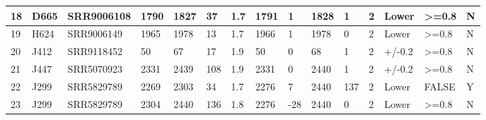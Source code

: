 \documentclass[a4paper]{paper}
\begin{document}
\begin{table}[htp]
\begin{tabular}{p{3cm}llllllllllllll}
\multicolumn{1}{|l|}{18} & \multicolumn{1}{l|}{D665} & \multicolumn{1}{l|}{SRR9006108} & \multicolumn{1}{l|}{1790} & \multicolumn{1}{l|}{1827} & \multicolumn{1}{l|}{37} & \multicolumn{1}{l|}{1.7} & \multicolumn{1}{l|}{1791} & \multicolumn{1}{l|}{1} & \multicolumn{1}{l|}{1828} & \multicolumn{1}{l|}{1} & \multicolumn{1}{l|}{2} & \multicolumn{1}{l|}{Lower} & \multicolumn{1}{l|}{\textgreater{}=0.8} & \multicolumn{1}{l|}{N} \\ \hline
\multicolumn{1}{|l|}{19} & \multicolumn{1}{l|}{H624} & \multicolumn{1}{l|}{SRR9006149} & \multicolumn{1}{l|}{1965} & \multicolumn{1}{l|}{1978} & \multicolumn{1}{l|}{13} & \multicolumn{1}{l|}{1.7} & \multicolumn{1}{l|}{1966} & \multicolumn{1}{l|}{1} & \multicolumn{1}{l|}{1978} & \multicolumn{1}{l|}{0} & \multicolumn{1}{l|}{2} & \multicolumn{1}{l|}{Lower} & \multicolumn{1}{l|}{\textgreater{}=0.8} & \multicolumn{1}{l|}{N} \\ \hline
\multicolumn{1}{|l|}{20} & \multicolumn{1}{l|}{J412} & \multicolumn{1}{l|}{SRR9118452} & \multicolumn{1}{l|}{50} & \multicolumn{1}{l|}{67} & \multicolumn{1}{l|}{17} & \multicolumn{1}{l|}{1.9} & \multicolumn{1}{l|}{50} & \multicolumn{1}{l|}{0} & \multicolumn{1}{l|}{68} & \multicolumn{1}{l|}{1} & \multicolumn{1}{l|}{2} & \multicolumn{1}{l|}{+/-0.2} & \multicolumn{1}{l|}{\textgreater{}=0.8} & \multicolumn{1}{l|}{N} \\ \hline
\multicolumn{1}{|l|}{21} & \multicolumn{1}{l|}{J447} & \multicolumn{1}{l|}{SRR5070923} & \multicolumn{1}{l|}{2331} & \multicolumn{1}{l|}{2439} & \multicolumn{1}{l|}{108} & \multicolumn{1}{l|}{1.9} & \multicolumn{1}{l|}{2331} & \multicolumn{1}{l|}{0} & \multicolumn{1}{l|}{2440} & \multicolumn{1}{l|}{1} & \multicolumn{1}{l|}{2} & \multicolumn{1}{l|}{+/-0.2} & \multicolumn{1}{l|}{\textgreater{}=0.8} & \multicolumn{1}{l|}{N} \\ \hline
\multicolumn{1}{|l|}{22} & \multicolumn{1}{l|}{J299} & \multicolumn{1}{l|}{SRR5829789} & \multicolumn{1}{l|}{2269} & \multicolumn{1}{l|}{2303} & \multicolumn{1}{l|}{34} & \multicolumn{1}{l|}{1.7} & \multicolumn{1}{l|}{2276} & \multicolumn{1}{l|}{7} & \multicolumn{1}{l|}{2440} & \multicolumn{1}{l|}{137} & \multicolumn{1}{l|}{2} & \multicolumn{1}{l|}{Lower} & \multicolumn{1}{l|}{FALSE} & \multicolumn{1}{l|}{Y} \\ \hline
\multicolumn{1}{|l|}{23} & \multicolumn{1}{l|}{J299} & \multicolumn{1}{l|}{SRR5829789} & \multicolumn{1}{l|}{2304} & \multicolumn{1}{l|}{2440} & \multicolumn{1}{l|}{136} & \multicolumn{1}{l|}{1.8} & \multicolumn{1}{l|}{2276} & \multicolumn{1}{l|}{-28} & \multicolumn{1}{l|}{2440} & \multicolumn{1}{l|}{0} & \multicolumn{1}{l|}{2} & \multicolumn{1}{l|}{Lower} & \multicolumn{1}{l|}{\textgreater{}=0.8} & \multicolumn{1}{l|}{N} \\ \hline

\end{tabular}
\end{table}
\end{document}
